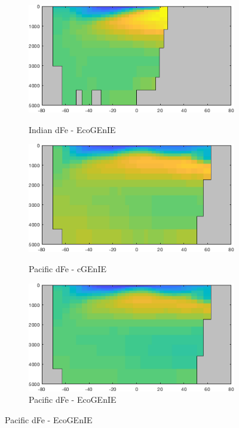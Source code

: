 \documentclass{article}
\begin{document}
\begin{figure}[htp]
\begin{subfigure}{.33\textwidth}
 \label{fig:nutrients1}
\end{subfigure}%
\begin{subfigure}{.33\textwidth}
 \caption{Indian dFe - EcoGEnIE}
 \includegraphics[width=0.95\linewidth]{../Separate_figures/ECOGEM/Indian_ocn_TDFe_profile.png}
 \label{fig:nutrients2}
\end{subfigure}
\begin{subfigure}{.33\textwidth}
 \caption{Pacific dFe - cGEnIE}
 \includegraphics[width=0.95\linewidth]{../Separate_figures/BIOGEM/Pacific_ocn_TDFe_profile.png}
 \label{fig:nutrients1}
\end{subfigure}%
\begin{subfigure}{.33\textwidth}
 \caption{Pacific dFe - EcoGEnIE}
 \includegraphics[width=0.95\linewidth]{../Separate_figures/ECOGEM/Pacific_ocn_TDFe_profile.png}

\end{subfigure}
\end{figure}
\end{document}
